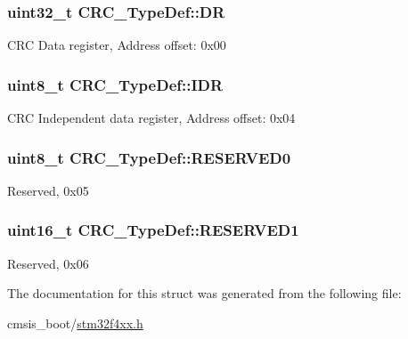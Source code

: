 \subsubsection[{\texorpdfstring{DR}{DR}}]{ uint32\+\_\+t C\+R\+C\+\_\+\+Type\+Def\+::\+DR}\hypertarget{struct_c_r_c___type_def_a50cb22870dbb9001241cec694994e5ef}{}\label{struct_c_r_c___type_def_a50cb22870dbb9001241cec694994e5ef}
C\+RC Data register, Address offset\+: 0x00 
\subsubsection[{\texorpdfstring{I\+DR}{IDR}}]{ uint8\+\_\+t C\+R\+C\+\_\+\+Type\+Def\+::\+I\+DR}\hypertarget{struct_c_r_c___type_def_ad84e8694cd4b5375ee533c2d875c3b5a}{}\label{struct_c_r_c___type_def_ad84e8694cd4b5375ee533c2d875c3b5a}
C\+RC Independent data register, Address offset\+: 0x04 
\subsubsection[{\texorpdfstring{R\+E\+S\+E\+R\+V\+E\+D0}{RESERVED0}}]{\setlength{\rightskip}{0pt plus 5cm}uint8\+\_\+t C\+R\+C\+\_\+\+Type\+Def\+::\+R\+E\+S\+E\+R\+V\+E\+D0}\hypertarget{struct_c_r_c___type_def_a70dfd1730dba65041550ef55a44db87c}{}\label{struct_c_r_c___type_def_a70dfd1730dba65041550ef55a44db87c}
Reserved, 0x05 
\subsubsection[{\texorpdfstring{R\+E\+S\+E\+R\+V\+E\+D1}{RESERVED1}}]{\setlength{\rightskip}{0pt plus 5cm}uint16\+\_\+t C\+R\+C\+\_\+\+Type\+Def\+::\+R\+E\+S\+E\+R\+V\+E\+D1}\hypertarget{struct_c_r_c___type_def_a8b205c6e25b1808ac016db2356b3021d}{}\label{struct_c_r_c___type_def_a8b205c6e25b1808ac016db2356b3021d}
Reserved, 0x06 

The documentation for this struct was generated from the following file\+:\begin{DoxyCompactItemize}
\item 
cmsis\+\_\+boot/\hyperlink{stm32f4xx_8h}{stm32f4xx.\+h}\end{DoxyCompactItemize}
